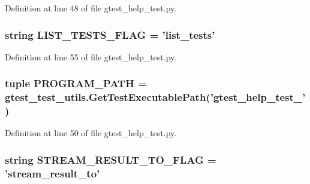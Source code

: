 \-Definition at line 48 of file gtest\-\_\-help\-\_\-test.\-py.

\hypertarget{namespacegtest__help__test_a6bd797257f4db78c152b6e62341177db}{
\subsubsection[{\-L\-I\-S\-T\-\_\-\-T\-E\-S\-T\-S\-\_\-\-F\-L\-A\-G}]{\setlength{\rightskip}{0pt plus 5cm}string {\bf \-L\-I\-S\-T\-\_\-\-T\-E\-S\-T\-S\-\_\-\-F\-L\-A\-G} = 'list\-\_\-tests'}}\label{de/dbf/namespacegtest__help__test_a6bd797257f4db78c152b6e62341177db}


\-Definition at line 55 of file gtest\-\_\-help\-\_\-test.\-py.

\hypertarget{namespacegtest__help__test_a3b816870dedd295e0dd9adf97b5f39b6}{
\subsubsection[{\-P\-R\-O\-G\-R\-A\-M\-\_\-\-P\-A\-T\-H}]{\setlength{\rightskip}{0pt plus 5cm}tuple {\bf \-P\-R\-O\-G\-R\-A\-M\-\_\-\-P\-A\-T\-H} = {\bf gtest\-\_\-test\-\_\-utils.\-Get\-Test\-Executable\-Path}('gtest\-\_\-help\-\_\-test\-\_\-')}}\label{de/dbf/namespacegtest__help__test_a3b816870dedd295e0dd9adf97b5f39b6}


\-Definition at line 50 of file gtest\-\_\-help\-\_\-test.\-py.

\hypertarget{namespacegtest__help__test_a0b9396da51ce1282c41896cc49871bb5}{
\subsubsection[{\-S\-T\-R\-E\-A\-M\-\_\-\-R\-E\-S\-U\-L\-T\-\_\-\-T\-O\-\_\-\-F\-L\-A\-G}]{\setlength{\rightskip}{0pt plus 5cm}string {\bf \-S\-T\-R\-E\-A\-M\-\_\-\-R\-E\-S\-U\-L\-T\-\_\-\-T\-O\-\_\-\-F\-L\-A\-G} = 'stream\-\_\-result\-\_\-to'}}\label{de/dbf/namespacegtest__help__test_a0b9396da51ce1282c41896cc49871bb5}


